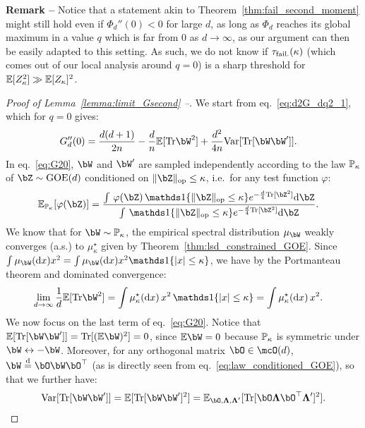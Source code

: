 \myskip 
\textbf{Remark --} Notice that a statement akin to Theorem~\ref{thm:fail_second_moment} might still hold even if $\Phi_d''(0) < 0$ for large $d$, as long 
as $\Phi_d$ reaches its global maximum in a value $q$ which is far from $0$ as $d \to \infty$, as our 
argument can then be easily adapted to this setting.
As such, we do not know if $\tau_{\rm fail.}(\kappa)$ (which 
comes out of our local analysis around $q = 0$) is a sharp threshold for $\mathbb{E}[Z_\kappa^2] \gg \mathbb{E}[Z_\kappa]^2$.

\myskip
\begin{proof}[Proof of Lemma~\ref{lemma:limit_Gsecond} --]
We start from eq.~\eqref{eq:d2G_dq2_1}, which for $q = 0$ gives:
\begin{align}\label{eq:G20}
    G_d''(0) &= \frac{d(d+1)}{2n} - \frac{d}{n} \EE[\Tr \bW^2] + \frac{d^2}{4n} \textrm{Var}[\Tr[\bW \bW']].
\end{align}
In eq.~\eqref{eq:G20}, $\bW$ and $\bW'$ are sampled independently according to the law 
$\mathbb{P}_\kappa$ of $\bZ \sim \GOE(d)$ conditioned on $\|\bZ\|_\op \leq \kappa$, i.e.\
for any test function $\varphi$:
\begin{align}\label{eq:law_conditioned_GOE}
    \EE_{\bbP_\kappa}[\varphi(\bZ)] &= \frac{\int \, \varphi(\bZ) \, \indi\{\|\bZ\|_\op \leq \kappa\} e^{-\frac{d}{4} \Tr[\bZ^2]} \rd \bZ}{\int \, \indi\{\|\bZ\|_\op \leq \kappa\} e^{-\frac{d}{4} \Tr[\bZ^2]} \rd \bZ}.
\end{align}
We know that for $\bW \sim \bbP_\kappa$, the empirical spectral distribution $\mu_\bW$ weakly converges (a.s.) to $\mu_\kappa^\star$ given by Theorem~\ref{thm:lsd_constrained_GOE}.
Since $\int \mu_\bW(\rd x) x^2 = \int \mu_\bW(\rd x) x^2 \indi\{|x| \leq \kappa\}$, we have by the Portmanteau theorem 
and dominated convergence: 
\begin{align}\label{eq:term_1_G20}
    \lim_{d \to \infty} \frac{1}{d}\EE[\Tr \bW^2] &= \int \mu_\kappa^\star(\rd x) \, x^2 \, \indi\{|x| \leq \kappa\} = \int \mu_\kappa^\star(\rd x) \, x^2.
\end{align}
We now focus on the last term of eq.~\eqref{eq:G20}.
Notice that $\EE[\Tr[\bW \bW']] = \Tr[(\EE \bW)^2] = 0$, since $\EE \bW = 0$ because $\mathbb{P}_\kappa$ is symmetric under $\bW \leftrightarrow - \bW$.
Moreover, for any orthogonal matrix $\bO \in \mcO(d)$, $\bW \deq \bO \bW \bO^\T$ (as is directly seen from eq.~\eqref{eq:law_conditioned_GOE}), so that we further have:
\begin{align}\label{eq:variance_Haar_measure}
   \textrm{Var}[\Tr[\bW \bW']] = \EE[\Tr[\bW \bW']^2]= \EE_{\bO, \bLambda, \bLambda'}[\Tr[\bO \bLambda \bO^\T \bLambda']^2].

\end{align}
\end{proof}
